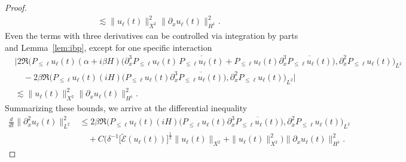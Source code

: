 \documentclass[10pt,a4paper]{amsart}
\begin{document}
\begin{proof}
$$\begin{aligned}
&\lesssim \| u_\ell(t) \|_{X^2}^2\| \partial_xu_\ell(t) \|_{H^1}^2.
\end{aligned} $$Even the terms with three derivatives can be controlled via integration by parts and Lemma~\ref{lem:ibp}, except for one specific interaction
$$\begin{aligned}
&\Big| 2\Re \big( P_{\leq \ell}u_\ell(t)(\alpha +i\beta H)\big(\partial_x^3P_{\leq \ell}u_\ell(t)\,\overline{P_{\leq \ell}u_\ell(t)}+P_{\leq \ell}u_\ell(t)\partial_x^3\overline{P_{\leq \ell}u_\ell(t)}\big) ,\partial_x^2P_{\leq \ell}u_\ell(t)\big)_{L^2} \\
&\quad -2\beta\Re \big( P_{\leq \ell}u_\ell(t)(iH)\big( P_{\leq \ell}u_\ell(t)\partial_x^3\overline{P_{\leq \ell}u_\ell(t)}\big) ,\partial_x^2P_{\leq \ell}u_\ell(t)\big)_{L^2} \Big| \\
&\lesssim \| u_\ell(t) \|_{X^2}^2\| \partial_xu_\ell(t) \|_{H^1}^2.
\end{aligned} $$
Summarizing these bounds, we arrive at the differential inequality
\begin{equation}\label{est:aprioriZ2-1}
\begin{aligned}
\frac{d}{dt}\| \partial_x^2u_\ell(t) \|_{L^2}^2 &\leq 2\beta\Re \big( P_{\leq \ell}u_\ell(t)(iH)\big( P_{\leq \ell}u_\ell(t)\partial_x^3\overline{P_{\leq \ell}u_\ell(t)}\big) ,\partial_x^2P_{\leq \ell}u_\ell(t)\big)_{L^2} \\
&\quad +C\Big( \delta^{-1}\big[ \widetilde{\mathcal{E}}(u_\ell(t))\big] ^{\frac12}\| u_\ell(t) \|_{X^2}+\| u_\ell(t) \|_{X^2}^2\Big) \| \partial_xu_\ell(t) \|_{H^1}^2.\end{aligned}\end{equation}


\end{proof}
\end{document}
